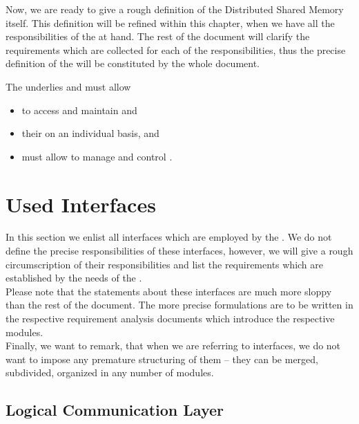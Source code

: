 \documentclass[a4paper, 12pt]{book}
\begin{document}
Now, we are ready to give a rough definition of the Distributed Shared Memory
itself. This definition will be refined within this chapter, when we have all
the responsibilities of the \SYNEIGHT at hand. The rest of the document
will clarify the requirements which are collected for each of the
responsibilities, thus the precise definition of the \SYNEIGHT will be
constituted by the whole document.

\begin{definition*}{\SYNEIGHT}
  \label{def:syneight1}
  The \SYNEIGHT underlies  and must allow
  \begin{itemize}
  \item to access and maintain  and
  \item their  on an individual basis, and
  \item must allow to manage and control .
  \end{itemize}
\end{definition*}

\section{Used Interfaces}

In this section we enlist all interfaces which are employed by the
\SYNEIGHT. We do not define the precise responsibilities of these
interfaces, however, we will give a rough circumscription of their
responsibilities and list the requirements which are established by
the needs of the \SYNEIGHT.\\
Please note that the statements about these interfaces are much more sloppy
than the rest of the document. The more precise formulations are to be written
in the respective requirement analysis documents which introduce the
respective modules.\\
Finally, we want to remark, that when we are referring to interfaces, we do not
want to impose any premature structuring of them -- they can be merged,
subdivided, organized in any number of modules.

\subsection{Logical Communication Layer}
\end{document}

